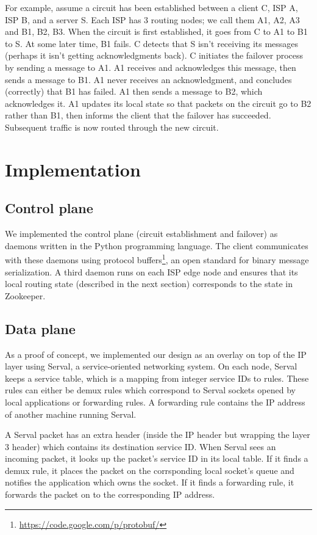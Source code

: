 \documentclass{article}
\begin{document}
For example, assume a circuit has been established between a client C,
ISP A, ISP B, and a server S. Each ISP has 3 routing nodes; we call
them A1, A2, A3 and B1, B2, B3. When the circuit is first established,
it goes from C to A1 to B1 to S. At some later time, B1 fails. C
detects that S isn't receiving its messages (perhaps it isn't getting
acknowledgments back). C initiates the failover process by sending a
message to A1. A1 receives and acknowledges this message, then sends a
message to B1. A1 never receives an acknowledgment, and concludes
(correctly) that B1 has failed. A1 then sends a message to B2, which
acknowledges it. A1 updates its local state so that packets on the
circuit go to B2 rather than B1, then informs the client that the
failover has succeeded. Subsequent traffic is now routed through the
new circuit.

\section{Implementation}
\subsection{Control plane}
We implemented the control plane (circuit establishment and failover)
as daemons written in the Python programming language. The client
communicates with these daemons using protocol
buffers\footnote{\url{https://code.google.com/p/protobuf/}}, an open
standard for binary message serialization. A third daemon runs on each
ISP edge node and ensures that its local routing state (described in
the next section) corresponds to the state in Zookeeper.
\subsection{Data plane}
As a proof of concept, we implemented our design as an overlay on top
of the IP layer using Serval, a service-oriented networking system. On
each node, Serval keeps a service table, which is a mapping from
integer service IDs to rules. These rules can either be demux rules
which correspond to Serval sockets opened by local applications or
forwarding rules. A forwarding rule contains the IP address of another
machine running Serval.

A Serval packet has an extra header (inside the IP header but wrapping
the layer 3 header) which contains its destination service ID. When
Serval sees an incoming packet, it looks up the packet's service ID in
its local table. If it finds a demux rule, it places the packet on
the corrsponding local socket's queue and notifies the application
which owns the socket. If it finds a forwarding rule, it forwards the
packet on to the corresponding IP address.
\end{document}
